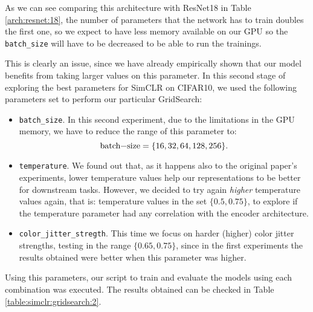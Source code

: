     As we can see comparing this architecture with ResNet18 in Table \ref{arch:resnet:18}, the number of parameters that the network has to train doubles the first one, so we expect to have less memory available on our GPU so the \lstinline{batch_size} will have to be decreased to be able to run the trainings. 
    
    This is clearly an issue, since we have already empirically shown  that our model benefits from taking larger values on this parameter. In this second stage of exploring the best parameters for SimCLR on CIFAR10, we used the following parameters set to perform our particular GridSearch:
    
    \begin{itemize}
        \item \lstinline{batch_size}. In this second experiment, due to the limitations in the GPU memory, we have to reduce the range of this parameter to:
        $$
        \text{\lstinline{batch-size}}=\{16,32,64,128,256\}.
        $$

        \item \lstinline{temperature}. We found out that, as it happens also to the original paper's experiments, lower temperature values help our representations to be better for downstream tasks. However, we decided to try again \emph{higher} temperature values again, that is: temperature values in the set $\{0.5,0.75\}$, to explore if the temperature parameter had any correlation with the encoder architecture.
        
        \item \lstinline{color_jitter_stregth}. This time we focus on harder (higher) color jitter strengths, testing in the range $\{0.65,0.75\}$, since in the first experiments the results obtained were better when this parameter was higher.
        
\end{itemize}

    Using this parameters, our script to train and evaluate the models using each combination was executed. The results obtained can be checked in Table \ref{table:simclr:gridsearch:2}.
    
